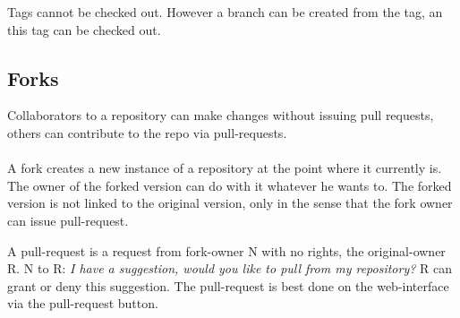 Tags cannot be checked out. However a branch can be created from the tag, an this tag can be checked out.

\subsection{Forks}
Collaborators to a repository can make changes without issuing pull requests, others can contribute to the repo via pull-requests.\\
\ \\
A fork creates a new instance of a repository at the point where it currently is. The owner of the forked version can do with it whatever  he wants to. The forked version is not linked to the original version, only in the sense that the fork owner can issue pull-request. 




A pull-request is a request from fork-owner N with no rights, the original-owner R. N to R: \textit{I have a suggestion, would you like to pull from my repository?} R can grant or deny this suggestion. The pull-request is best done on the web-interface via the pull-request button.